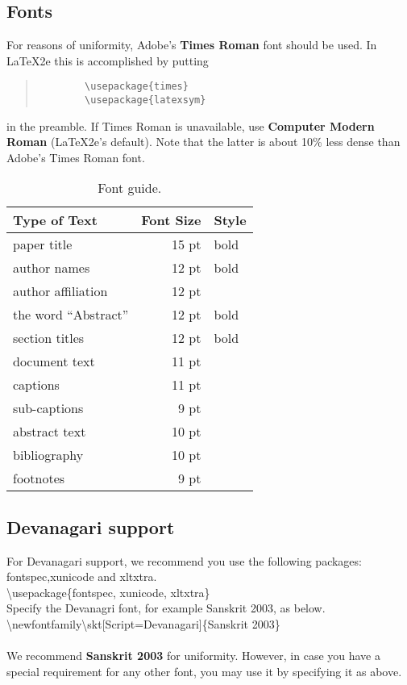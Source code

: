\documentclass[11pt]{article}
\begin{document}
	\subsection{Fonts}
	For reasons of uniformity, Adobe's {\bf Times Roman} font should be
	used. In \LaTeX2e{} this is accomplished by putting
	
	\begin{quote}
		\begin{verbatim}
		\usepackage{times}
		\usepackage{latexsym}
		\end{verbatim}
	\end{quote}
	in the preamble. If Times Roman is unavailable, use {\bf Computer
		Modern Roman} (\LaTeX2e{}'s default).  Note that the latter is about
	10\% less dense than Adobe's Times Roman font.
	
	\begin{table}[h]
		\begin{center}
			\begin{tabular}{|l|rl|}
				\hline \bf Type of Text & \bf Font Size & \bf Style \\ \hline
				paper title & 15 pt & bold \\
				author names & 12 pt & bold \\
				author affiliation & 12 pt & \\
				the word ``Abstract'' & 12 pt & bold \\
				section titles & 12 pt & bold \\
				document text & 11 pt  &\\
				captions & 11 pt & \\
				sub-captions & 9 pt & \\
				abstract text & 10 pt & \\
				bibliography & 10 pt & \\
				footnotes & 9 pt & \\
				\hline
			\end{tabular}
		\end{center}
		\caption{\label{font-table} Font guide. }
	\end{table}
	
	\subsection{Devanagari support}
	For Devanagari support, we recommend you use the following packages: fontspec,xunicode and xltxtra. \\
	\textbackslash usepackage\{fontspec, xunicode, xltxtra\}\\
	Specify the Devanagri font, for example Sanskrit 2003, as below.\\
	\textbackslash newfontfamily\textbackslash skt[Script=Devanagari]\{Sanskrit 2003\}\\ \\
	We recommend {\bf Sanskrit 2003} for uniformity. However, in case you have a special requirement for any other font, you may use it by specifying it as above.\\
	
\end{document}
